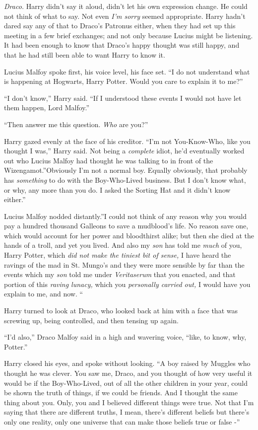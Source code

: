 \emph{Draco.} Harry didn't say it aloud, didn't let his own expression
change. He could not think of what to say. Not even \emph{I'm sorry}
seemed appropriate. Harry hadn't dared say any of that to Draco's
Patronus either, when they had set up this meeting in a few brief
exchanges; and not only because Lucius might be listening. It had been
enough to know that Draco's happy thought was still happy, and that he
had still been able to want Harry to know it.

Lucius Malfoy spoke first, his voice level, his face set. ``I do not
understand what is happening at Hogwarts, Harry Potter. Would you care
to explain it to me?''

``I don't know,'' Harry said. ``If I understood these events I would not
have let them happen, Lord Malfoy.''

``Then answer me this question. \emph{Who} are you?''

Harry gazed evenly at the face of his creditor. ``I'm not You-Know-Who,
like you thought I was,'' Harry said. Not being a \emph{complete} idiot,
he'd eventually worked out who Lucius Malfoy had thought he was talking
to in front of the Wizengamot.''Obviously I'm not a normal boy. Equally
obviously, that probably has \emph{something} to do with the
Boy-Who-Lived business. But I don't know what, or why, any more than you
do. I asked the Sorting Hat and it didn't know either.''

Lucius Malfoy nodded distantly.''I could not think of any reason why you
would pay a hundred thousand Galleons to save a mudblood's life. No
reason save one, which would account for her power and bloodthirst
alike; but then she died at the hands of a troll, and yet you lived. And
also my \emph{son} has told me \emph{much} of you, Harry Potter, which
\emph{did not make the tiniest bit of sense,} I have heard the ravings
of the mad in St. Mungo's and they were more sensible by far than the
events which my \emph{son} told me under \emph{Veritaserum} that you
enacted, and that portion of this \emph{raving lunacy,} which you
\emph{personally carried out,} I would have you explain to me, and now.
``

Harry turned to look at Draco, who looked back at him with a face that
was screwing up, being controlled, and then tensing up again.

``I'd also,'' Draco Malfoy said in a high and wavering voice, ``like, to
know, why, Potter.''

Harry closed his eyes, and spoke without looking. ``A boy raised by
Muggles who thought he was clever. You saw me, Draco, and you thought of
how very useful it would be if the Boy-Who-Lived, out of all the other
children in your year, could be shown the truth of things, if we could
be friends. And I thought the same thing about you. Only, you and I
believed different things were true. Not that I'm saying that there are
different truths, I mean, there's different beliefs but there's only one
reality, only one universe that can make those beliefs true or false -''

